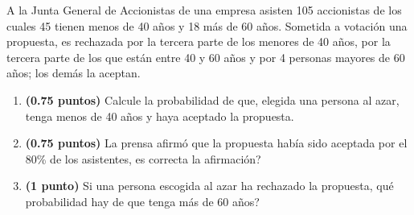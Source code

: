 
A la Junta General de Accionistas de una empresa asisten 105 accionistas de los cuales 45 tienen menos de 40 años y 18 más de 60 años. Sometida a votación una propuesta, es rechazada por la tercera parte de los menores de 40 años, por la tercera parte de los que están entre 40 y 60 años y por 4 personas mayores de 60 años; los demás la aceptan.
\begin{enumerate}[label=\alph*)]
\item \textbf{(0.75 puntos)} Calcule la probabilidad de que, elegida una persona al azar, tenga menos de 40 años y haya aceptado la propuesta.
\item \textbf{(0.75 puntos)} La prensa afirmó que la propuesta había sido aceptada por el 80\% de los asistentes, \textquestiondown{}es correcta la afirmación?
\item \textbf{(1 punto)} Si una persona escogida al azar ha rechazado la propuesta, \textquestiondown{}qué probabilidad hay de que tenga más de 60 años?
\end{enumerate}
